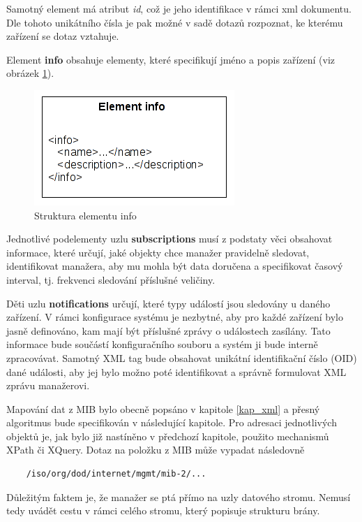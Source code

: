 Samotný element má atribut \textit{id}, což je jeho identifikace v rámci xml dokumentu. Dle tohoto unikátního čísla je pak možné
v sadě dotazů rozpoznat, ke kterému zařízení se dotaz vztahuje.

Element \textbf{info} obsahuje elementy, které specifikují jméno a popis zařízení (viz obrázek \ref{obr_an_info_element}).

\begin{figure}[htp]
	\begin{center}
		\includegraphics{obrazky/04_element_info.png}
		\caption{Struktura elementu info}
		\label{obr_an_info_element}
	\end{center}
\end{figure}

Jednotlivé podelementy uzlu \textbf{subscriptions} musí z podstaty věci obsahovat informace, které určují, jaké objekty chce manažer pravidelně sledovat, identifikovat
manažera, aby mu mohla být data doručena a specifikovat časový interval, tj. frekvenci sledování příslušné veličiny.

Děti uzlu \textbf{notifications} určují, které typy událostí jsou sledovány u daného zařízení. V rámci konfigurace systému je nezbytné, aby pro každé zařízení
bylo jasně definováno, kam mají být příslušné zprávy o událostech zasílány. Tato informace bude součástí konfiguračního souboru a systém ji bude
interně zpracovávat. Samotný XML tag bude obsahovat unikátní identifikační číslo (OID) dané události, aby jej bylo možno poté identifikovat a správně formulovat
XML zprávu manažerovi.

Mapování dat z MIB bylo obecně popsáno v kapitole \ref{kap_xml} a přesný algoritmus bude specifikován v následující kapitole. Pro adresaci jednotlivých objektů
je, jak bylo již nastíněno v předchozí kapitole, použito mechanismů XPath či XQuery. Dotaz na položku z MIB může vypadat následovně
\begin{verbatim}
	/iso/org/dod/internet/mgmt/mib-2/...
\end{verbatim}

Důležitým faktem je, že manažer se ptá přímo na uzly datového stromu. Nemusí tedy uvádět cestu v rámci celého stromu, který popisuje strukturu brány.

